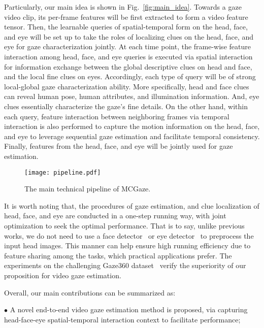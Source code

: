 \documentclass[journal]{IEEEtran}
\begin{document}
Particularly, our main idea is shown in Fig.~\ref{fig:main_idea}. Towards a gaze video clip, its per-frame features will be first extracted to form a video feature tensor. Then, the learnable queries of spatial-temporal form on the head, face, and eye will be set up to take the roles of localizing clues on the head, face, and eye for gaze characterization jointly. At each time point, the frame-wise feature interaction among head, face, and eye queries is executed via spatial interaction for information exchange between the global descriptive clues on head and face, and the local fine clues on eyes. Accordingly, each type of query will be of strong local-global gaze characterization ability. More specifically, head and face clues can reveal human pose, human attributes, and illumination information. And, eye clues essentially characterize the gaze's fine details. On the other hand, within each query, feature interaction between neighboring frames via temporal interaction is also performed to capture the motion information on the head, face, and eye to leverage sequential gaze estimation and facilitate temporal consistency. Finally, features from the head, face, and eye will be jointly used for gaze estimation.
\begin{figure*}[t]
\vspace{-6mm}
\begin{center}
\texttt{[image: pipeline.pdf]}
\vspace{-5mm}
\end{center}
        \caption{The main technical pipeline of MCGaze.}
\label{fig:pipeline}
\vspace{-5mm}
\end{figure*}
It is worth noting that, the procedures of gaze estimation, and clue localization of head, face, and eye are conducted in a one-step running way, with joint optimization to seek the optimal performance. That is to say, unlike previous works, we do not need to use a face detector~\cite{mtcnn} or eye detector~\cite{SPL_Facial_Landmark,faciallandmark_tip_23} to preprocess the input head images. This manner can help ensure high running efficiency due to feature sharing among the tasks, which practical applications prefer. The experiments on the challenging Gaze360 dataset~\cite{kellnhofer2019gaze360} verify the superiority of our proposition for video gaze estimation.

Overall, our main contributions can be summarized as:

$\bullet$ A novel end-to-end video gaze estimation method is proposed, via capturing head-face-eye spatial-temporal interaction context to facilitate performance;
\end{document}
